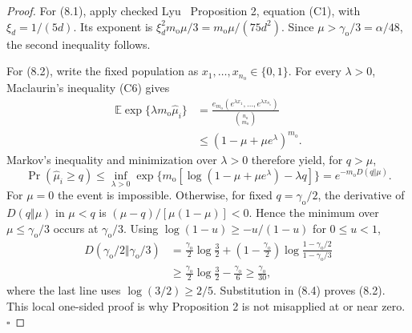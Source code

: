 \begin{proof}
For (8.1), apply checked Lyu~\citep{lyu2025} Proposition 2, equation (C1), with
\(\xi_d=1/(5d)\). Its exponent is
\(\xi_d^2m_{\mathrm o}\mu/3=m_{\mathrm o}\mu/(75d^2)\).
Since
\(\mu>\gamma_{\mathrm o}/3=\alpha/48\), the second inequality follows.

For (8.2), write the fixed population as
\(x_1,\ldots,x_{n_{\mathrm o}}\in\{0,1\}\). For every \(\lambda>0\),
Maclaurin's inequality (C6) gives
\[
\begin{aligned}
\mathbb E\exp\{\lambda m_{\mathrm o}\widehat\mu_i\}
&=\frac{e_{m_{\mathrm o}}
(e^{\lambda x_1},\ldots,e^{\lambda x_{n_{\mathrm o}}})}
{\binom{n_{\mathrm o}}{m_{\mathrm o}}}\\
&\le(1-\mu+\mu e^\lambda)^{m_{\mathrm o}}.
\end{aligned}
\tag{8.3}
\]
Markov's inequality and minimization over \(\lambda>0\) therefore yield,
for \(q>\mu\),
\[
\Pr(\widehat\mu_i\ge q)
\le\inf_{\lambda>0}
\exp\{m_{\mathrm o}[\log(1-\mu+\mu e^\lambda)-\lambda q]\}
=e^{-m_{\mathrm o}D(q\Vert\mu)}.
\tag{8.4}
\]
For \(\mu=0\) the event is impossible. Otherwise, for fixed
\(q=\gamma_{\mathrm o}/2\), the derivative of
\(D(q\Vert\mu)\) in \(\mu<q\) is
\((\mu-q)/[\mu(1-\mu)]<0\). Hence the minimum over
\(\mu\le\gamma_{\mathrm o}/3\) occurs at \(\gamma_{\mathrm o}/3\).
Using \(\log(1-u)\ge-u/(1-u)\) for \(0\le u<1\),
\[
\begin{aligned}
D(\gamma_{\mathrm o}/2\Vert\gamma_{\mathrm o}/3)
&=\frac{\gamma_{\mathrm o}}2\log\frac32
+\left(1-\frac{\gamma_{\mathrm o}}2\right)
\log\frac{1-\gamma_{\mathrm o}/2}{1-\gamma_{\mathrm o}/3}\\
&\ge\frac{\gamma_{\mathrm o}}2\log\frac32
-\frac{\gamma_{\mathrm o}}6
\ge\frac{\gamma_{\mathrm o}}{30},
\end{aligned}
\tag{8.5}
\]
where the last line uses \(\log(3/2)\ge2/5\). Substitution in (8.4)
proves (8.2). This local one-sided proof is why Proposition 2 is not
misapplied at or near zero. \(\square\)


\end{proof}

